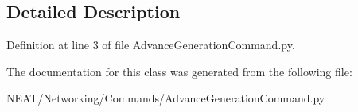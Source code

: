 \subsection{Detailed Description}


Definition at line 3 of file Advance\+Generation\+Command.\+py.



The documentation for this class was generated from the following file\+:\begin{DoxyCompactItemize}
\item 
N\+E\+A\+T/\+Networking/\+Commands/Advance\+Generation\+Command.\+py\end{DoxyCompactItemize}
